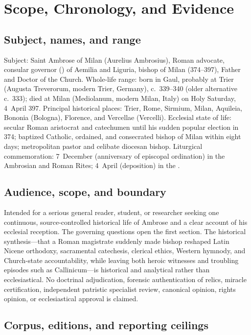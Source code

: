 \section{Scope, Chronology, and Evidence}

\subsection{Subject, names, and range}

Subject: Saint Ambrose of Milan (Aurelius Ambrosius), Roman advocate, consular governor () of Aemilia and Liguria, bishop of Milan (374--397), Father and Doctor of the Church. Whole-life range: born in Gaul, probably at Trier (Augusta Treverorum, modern Trier, Germany), c.~339--340 (older alternative c.~333); died at Milan (Mediolanum, modern Milan, Italy) on Holy Saturday, 4~April 397. Principal historical places: Trier, Rome, Sirmium, Milan, Aquileia, Bononia (Bologna), Florence, and Vercellae (Vercelli). Ecclesial state of life: secular Roman aristocrat and catechumen until his sudden popular election in 374; baptized Catholic, ordained, and consecrated bishop of Milan within eight days; metropolitan pastor and celibate diocesan bishop. Liturgical commemoration: 7~December (anniversary of episcopal ordination) in the Ambrosian and Roman Rites; 4~April (deposition) in the .

\subsection{Audience, scope, and boundary}

Intended for a serious general reader, student, or researcher seeking one continuous, source-controlled historical life of Ambrose and a clear account of his ecclesial reception. The governing questions open the first section. The historical synthesis---that a Roman magistrate suddenly made bishop reshaped Latin Nicene orthodoxy, sacramental catechesis, clerical ethics, Western hymnody, and Church-state accountability, while leaving both heroic witnesses and troubling episodes such as Callinicum---is historical and analytical rather than ecclesiastical. No doctrinal adjudication, forensic authentication of relics, miracle certification, independent patristic specialist review, canonical opinion, rights opinion, or ecclesiastical approval is claimed.

\subsection{Corpus, editions, and reporting ceilings}

